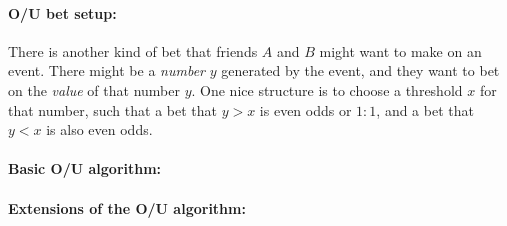 \documentclass{article}
\begin{document}
\paragraph{O/U bet setup:}
There is another kind of bet that friends $A$ and $B$ might want to make on an event.
There might be a \emph{number} $y$ generated by the event, and they want to bet on the \emph{value} of that number $y$.
One nice structure is to choose a threshold $x$ for that number, such that a bet that $y>x$ is even odds or $1:1$, and
a bet that $y<x$ is also even odds.

\paragraph{Basic O/U algorithm:}

\paragraph{Extensions of the O/U algorithm:}
\end{document}
